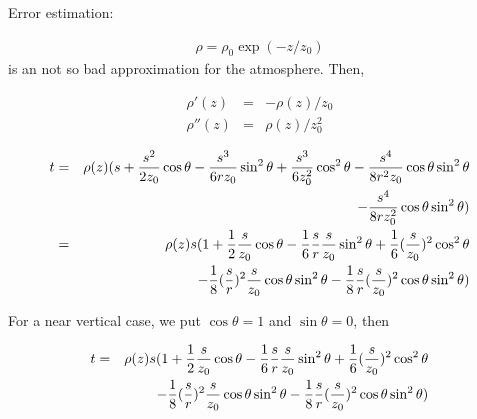 Error estimation:



\begin{eqnarray}
\rho = \rho_0 \exp(-z/z_0)
\end{eqnarray}
is an not so bad approximation for the atmosphere.  Then,

\begin{eqnarray}
\rho'(z) &=&- \rho(z)/z_0\nonumber \\
\rho''(z) & = & \rho(z)/z_0^2
\end{eqnarray}

\begin{eqnarray}
t&=&\rho(z)(s + {s^2 \over 2z_0}\cos\theta-{s^3 \over 6rz_0}\sin^2\theta +{s^3 \over 6z_0^2}\cos^2\theta -{s^4 \over 8r^2z_0}\cos\theta\sin^2\theta\nonumber \\
& & - {s^4 \over 8rz_0^2}\cos\theta\sin^2\theta)\\
&=&\rho(z)s(1 + {1 \over 2}{s\over z_0}\cos\theta-{1 \over 6}{s\over r}{ s\over z_0}\sin^2\theta
 +{1 \over 6}({s\over z_0})^2\cos^2\theta \nonumber \\ 
& &-{1 \over 8}({s \over r})^2{s \over z_0}\cos\theta\sin^2\theta
-{ 1\over 8} {s \over r}({s \over z_0})^2\cos\theta\sin^2\theta)
\end{eqnarray}

For a near vertical case, we put $\cos\theta=1$ and  $\sin\theta=0$, then

\begin{eqnarray}
t&=&\rho(z)s(1 + {1 \over 2}{s\over z_0}\cos\theta-{1 \over 6}{s\over r}{ s\over z_0}\sin^2\theta
 +{1 \over 6}({s\over z_0})^2\cos^2\theta \nonumber \\ 
& &-{1 \over 8}({s \over r})^2{s \over z_0}\cos\theta\sin^2\theta
-{ 1\over 8} {s \over r}({s \over z_0})^2\cos\theta\sin^2\theta)
\end{eqnarray}






